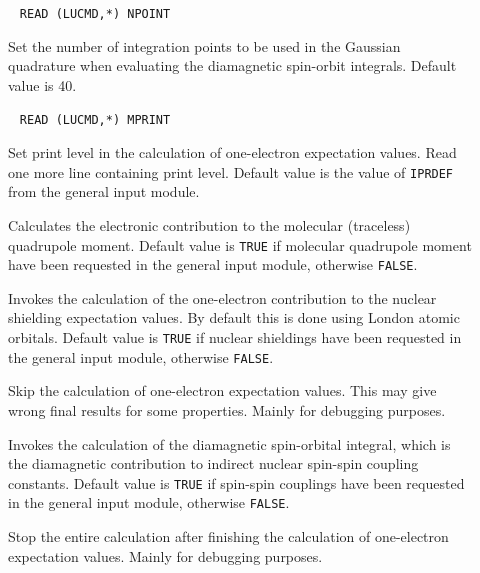 \begin{description}
\item[]\verb| |\newline
\verb|READ (LUCMD,*) NPOINT|

Set the number of integration points to be used in the Gaussian
quadrature
when evaluating  the diamagnetic spin-orbit integrals. Default value is 40.

\item[]\verb| |\newline
\verb|READ (LUCMD,*) MPRINT|

Set print level in the calculation of one-electron expectation values.
Read one more line containing print level. Default value is the
value of \verb|IPRDEF| from the general input module.

\item[] Calculates the electronic contribution to the
molecular (traceless) quadrupole moment. Default value is \verb|TRUE| 
if molecular quadrupole moment have been requested in the general input
module, otherwise \verb|FALSE|.

\item[] Invokes the calculation of the one-electron
contribution to the nuclear shielding
expectation values. By default 
this is done using London atomic
orbitals. Default value is 
\verb|TRUE| if nuclear shieldings have been requested in the general
input module, otherwise \verb|FALSE|.

\item[] Skip the calculation of one-electron expectation
values. This may give wrong final results for some properties. Mainly
for debugging purposes.

\item[] Invokes the calculation of the diamagnetic
spin-orbital integral, which is the
diamagnetic contribution to 
indirect nuclear spin-spin coupling
constants. Default value is 
\verb|TRUE| if spin-spin couplings have been requested in the general
input module, otherwise \verb|FALSE|.

\item[] Stop the entire calculation after finishing the
calculation of one-electron expectation values. Mainly for debugging
purposes.

\end{description}

